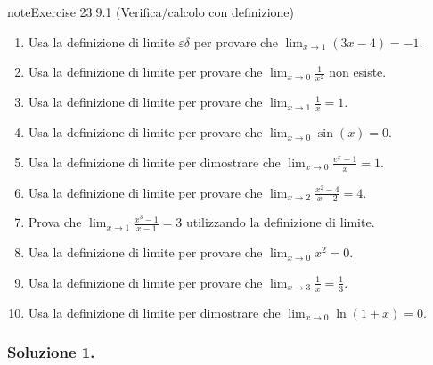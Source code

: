 \documentclass[letterpaper,10pt,italian]{jupyterBook}
\begin{document}
\begin{sphinxadmonition}{note}{Exercise 23.9.1 (Verifica/calcolo con definizione)}


\begin{enumerate}
%
\item {} 
\sphinxAtStartPar
Usa la definizione di limite \(\varepsilon\)\sphinxhyphen{}\(\delta\) per provare che \(\lim_{x \to 1} (3x - 4) = -1\).

\item {} 
\sphinxAtStartPar
Usa la definizione di limite per provare che \(\lim_{x \to 0} \frac{1}{x^2}\) non esiste.

\item {} 
\sphinxAtStartPar
Usa la definizione di limite per provare che \(\lim_{x \to 1} \frac{1}{x} = 1\).

\item {} 
\sphinxAtStartPar
Usa la definizione di limite per provare che \(\lim_{x \to 0} \sin(x) = 0\).

\item {} 
\sphinxAtStartPar
Usa la definizione di limite per dimostrare che \(\lim_{x \to 0} \frac{e^x - 1}{x} = 1\).

\item {} 
\sphinxAtStartPar
Usa la definizione di limite per provare che \(\lim_{x \to 2} \frac{x^2 - 4}{x - 2} = 4\).

\item {} 
\sphinxAtStartPar
Prova che \(\lim_{x \to 1} \frac{x^3 - 1}{x - 1} = 3\) utilizzando la definizione di limite.

\item {} 
\sphinxAtStartPar
Usa la definizione di limite per provare che \(\lim_{x \to 0} x^2 = 0\).

\item {} 
\sphinxAtStartPar
Usa la definizione di limite per provare che \(\lim_{x \to 3} \frac{1}{x} = \frac{1}{3}\).

\item {} 
\sphinxAtStartPar
Usa la definizione di limite per dimostrare che \(\lim_{x \to 0} \ln(1+x) = 0\).

\end{enumerate}
\end{sphinxadmonition}
\subsubsection*{Soluzione 1.}
\end{document}
